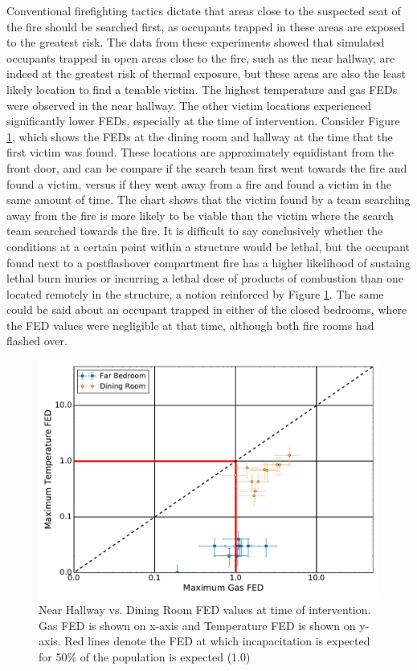 \documentclass[12pt,oneside]{article}
\begin{document}
Conventional firefighting tactics \cite{Mittendorf,Norman} dictate that areas close to the suspected seat of the fire should be searched first, as occupants trapped in these areas are exposed to the greatest risk. The data from these experiments showed that simulated occupants trapped in open areas close to the fire, such as the near hallway, are indeed at the greatest risk of thermal exposure, but these areas are also the least likely location to find a tenable victim. The highest temperature and gas FEDs were observed in the near hallway. The other victim locations experienced significantly lower FEDs, especially at the time of intervention. Consider Figure \ref{fig:open_FED_compare}, which shows the FEDs at the dining room and hallway at the time that the first victim was found. These locations are approximately equidistant from the front door, and can be compare if the search team first went towards the fire and found a victim, versus if they went away from a fire and found a victim in the same amount of time. The chart shows that the victim found by a team searching away from the fire is more likely to be viable than the victim where the search team searched towards the fire. It is difficult to say conclusively whether the conditions at a certain point within a structure would be lethal, but the occupant found next to a postflashover compartment fire has a higher likelihood of sustaing lethal burn inuries or incurring a lethal dose of products of combustion than one located remotely in the structure, a notion reinforced by Figure \ref{fig:open_FED_compare}. The same could be said about an occupant trapped in either of the closed bedrooms, where the FED values were negligible at that time, although both fire rooms had flashed over.  

\begin{figure}[!ht]
	\centering
	\includegraphics[width=.75\textwidth]{../Figures/br_compare/Far}
	\caption[Near Hallway vs. Dining Room FED values at time of intervention]{Near Hallway vs. Dining Room FED values at time of intervention. Gas FED is shown on x-axis and Temperature FED is shown on y-axis. Red lines denote the FED at which incapacitation is expected for 50\% of the population is expected (1.0)}
	\label{fig:open_FED_compare}
\end{figure}
\end{document}
